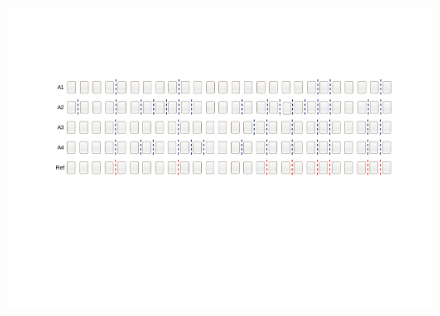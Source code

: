 
  \begin{center}
	\begin{figure}[h!]

	\includegraphics[trim={ 95 255 75 140 },clip,page=1,width=\textwidth]{images/segmentacao-referencia.pdf}

	\end{figure}
\end{center}











